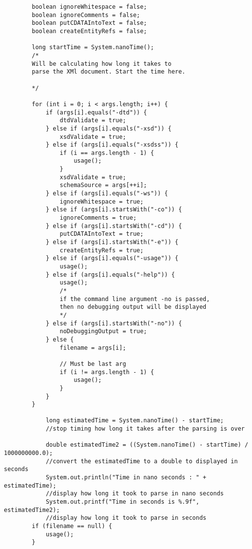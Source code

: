 \documentclass[11pt,english]{article}
\begin{document}
\begin{enumerate}
\begin{lstlisting}
        boolean ignoreWhitespace = false;
        boolean ignoreComments = false;
        boolean putCDATAIntoText = false;
        boolean createEntityRefs = false;

        long startTime = System.nanoTime();
        /*
        Will be calculating how long it takes to
        parse the XMl document. Start the time here.

        */

        for (int i = 0; i < args.length; i++) {
            if (args[i].equals("-dtd")) {
                dtdValidate = true;
            } else if (args[i].equals("-xsd")) {
                xsdValidate = true;
            } else if (args[i].equals("-xsdss")) {
                if (i == args.length - 1) {
                    usage();
                }
                xsdValidate = true;
                schemaSource = args[++i];
            } else if (args[i].equals("-ws")) {
                ignoreWhitespace = true;
            } else if (args[i].startsWith("-co")) {
                ignoreComments = true;
            } else if (args[i].startsWith("-cd")) {
                putCDATAIntoText = true;
            } else if (args[i].startsWith("-e")) {
                createEntityRefs = true;
            } else if (args[i].equals("-usage")) {
                usage();
            } else if (args[i].equals("-help")) {
                usage();
                /*
                if the command line argument -no is passed,
                then no debugging output will be displayed
                */
            } else if (args[i].startsWith("-no")) {
                noDebuggingOutput = true;
            } else {
                filename = args[i];

                // Must be last arg
                if (i != args.length - 1) {
                    usage();
                }
            }
        }

            long estimatedTime = System.nanoTime() - startTime;
            //stop timing how long it takes after the parsing is over

            double estimatedTime2 = ((System.nanoTime() - startTime) / 1000000000.0);
            //convert the estimatedTime to a double to displayed in seconds
            System.out.println("Time in nano seconds : " + estimatedTime);
            //display how long it took to parse in nano seconds
            System.out.printf("Time in seconds is %.9f", estimatedTime2);
            //display how long it took to parse in seconds
        if (filename == null) {
            usage();
        }


\end{lstlisting}
\end{enumerate}
\end{document}
